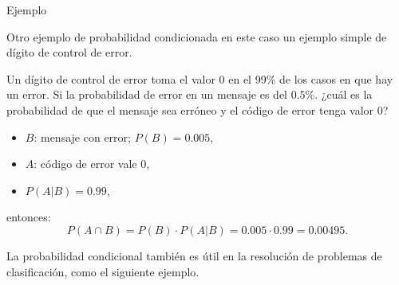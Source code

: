 \documentclass[
  letterpaper,
  DIV=11,
  numbers=noendperiod]{scrreprt}
\providecommand{\tightlist}{%
  \setlength{\itemsep}{0pt}\setlength{\parskip}{0pt}}\usepackage{longtable,booktabs,array}
\begin{document}
\begin{Ejemplo}{Ejemplo}{}

Otro ejemplo de probabilidad condicionada en este caso un ejemplo simple
de dígito de control de error.

Un dígito de control de error toma el valor 0 en el 99\% de los casos en
que hay un error. Si la probabilidad de error en un mensaje es del
\(0.5\%\). ¿cuál es la probabilidad de que el mensaje sea erróneo y el
código de error tenga valor 0?

\begin{itemize}
\tightlist
\item
  \(B\): mensaje con error; \(P(B)=0.005\),
\item
  \(A\): código de error vale 0,
\item
  \(P(A|B)=0.99\),
\end{itemize}

entonces: \[P(A\cap B)=P(B)\cdot P(A|B)=0.005\cdot 0.99=0.00495.\]

\end{Ejemplo}

La probabilidad condicional también es útil en la resolución de
problemas de clasificación, como el siguiente ejemplo.
\end{document}
